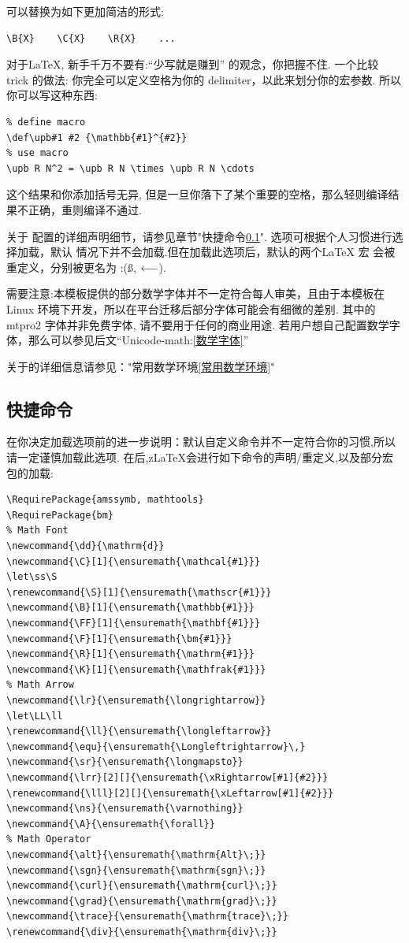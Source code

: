 可以替换为如下更加简洁的形式:
\begin{verbatim}
\B{X}    \C{X}    \R{X}    ...
\end{verbatim}

对于\LaTeX{}, 新手千万不要有:``少写就是赚到'' 的观念，你把握不住. 一个比较 trick 的做法:
你完全可以定义空格为你的 delimiter，以此来划分你的宏参数. 所以你可以写这种东西:
\begin{verbatim}
% define macro
\def\upb#1 #2 {\mathbb{#1}^{#2}}
% use macro
\upb R N^2 = \upb R N \times \upb R N \cdots
\end{verbatim}

这个结果和你添加括号无异, 但是一旦你落下了某个重要的空格，那么轻则编译结果不正确，重则编译不通过.

关于  配置的详细声明细节，请参见章节"快捷命令\cref{快捷命令}".  选项可根据个人习惯进行选择加载，默认
情况下并不会加载.但在加载此选项后，默认的两个\LaTeX{} 宏 \cmd{\S, \ll} 会被重定义，分别被更名为 \cmd{\ss, \LL}:(\ss, $\LL$). 

需要注意:本模板提供的部分数学字体并不一定符合每人审美，且由于本模板在 Linux 环境下开发，所以在平台迁移后部分字体可能会有细微的差别.
其中的 {mtpro2} 字体并非免费字体, 请不要用于任何的商业用途. 若用户想自己配置数学字体，那么可以参见后文``Unicode-math:\cref{数学字体}''

\begin{remark}
关于的详细信息请参见："常用数学环境\cref{常用数学环境}"
\end{remark}

\subsection{快捷命令}\label{快捷命令}
在你决定加载选项前的进一步说明：默认自定义命令并不一定符合你的习惯,所以请一定谨慎加载此选项.
在后,z\LaTeX{}会进行如下命令的声明/重定义,以及部分宏包的加载:
\begin{verbatim}
\RequirePackage{amssymb, mathtools}
\RequirePackage{bm}          
% Math Font 
\newcommand{\dd}{\mathrm{d}}
\newcommand{\C}[1]{\ensuremath{\mathcal{#1}}}
\let\ss\S
\renewcommand{\S}[1]{\ensuremath{\mathscr{#1}}}
\newcommand{\B}[1]{\ensuremath{\mathbb{#1}}}
\newcommand{\FF}[1]{\ensuremath{\mathbf{#1}}}
\newcommand{\F}[1]{\ensuremath{\bm{#1}}}
\newcommand{\R}[1]{\ensuremath{\mathrm{#1}}}
\newcommand{\K}[1]{\ensuremath{\mathfrak{#1}}}
% Math Arrow 
\newcommand{\lr}{\ensuremath{\longrightarrow}}
\let\LL\ll
\renewcommand{\ll}{\ensuremath{\longleftarrow}}
\newcommand{\equ}{\ensuremath{\Longleftrightarrow}\,}
\newcommand{\sr}{\ensuremath{\longmapsto}}
\newcommand{\lrr}[2][]{\ensuremath{\xRightarrow[#1]{#2}}}
\renewcommand{\lll}[2][]{\ensuremath{\xLeftarrow[#1]{#2}}}
\newcommand{\ns}{\ensuremath{\varnothing}}
\newcommand{\A}{\ensuremath{\forall}}
% Math Operator
\newcommand{\alt}{\ensuremath{\mathrm{Alt}\;}}
\newcommand{\sgn}{\ensuremath{\mathrm{sgn}\;}}
\newcommand{\curl}{\ensuremath{\mathrm{curl}\;}}
\newcommand{\grad}{\ensuremath{\mathrm{grad}\;}}
\newcommand{\trace}{\ensuremath{\mathrm{trace}\;}}
\renewcommand{\div}{\ensuremath{\mathrm{div}\;}}
\end{verbatim}

